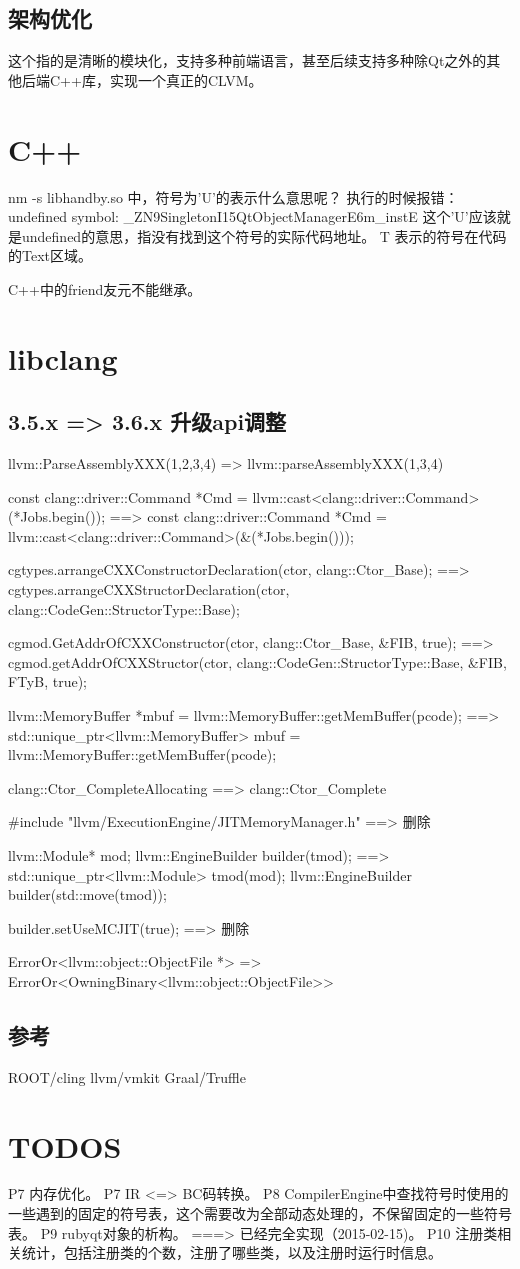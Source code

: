 \section{架构优化}
这个指的是清晰的模块化，支持多种前端语言，甚至后续支持多种除Qt之外的其他后端C++库，实现一个真正的CLVM。


\chapter{C++}
nm -s libhandby.so 中，符号为'U'的表示什么意思呢？
执行的时候报错：undefined symbol: \_ZN9SingletonI15QtObjectManagerE6m\_instE
这个'U'应该就是undefined的意思，指没有找到这个符号的实际代码地址。
T 表示的符号在代码的Text区域。

C++中的friend友元不能继承。

\chapter{libclang}
\section{3.5.x => 3.6.x 升级api调整}
llvm::ParseAssemblyXXX(1,2,3,4) => llvm::parseAssemblyXXX(1,3,4)

const clang::driver::Command *Cmd = llvm::cast<clang::driver::Command>(*Jobs.begin());
==> const clang::driver::Command *Cmd = llvm::cast<clang::driver::Command>(&(*Jobs.begin()));

cgtypes.arrangeCXXConstructorDeclaration(ctor, clang::Ctor\_Base);
==>  cgtypes.arrangeCXXStructorDeclaration(ctor, clang::CodeGen::StructorType::Base);

cgmod.GetAddrOfCXXConstructor(ctor, clang::Ctor\_Base, &FIB, true);
==>  cgmod.getAddrOfCXXStructor(ctor, clang::CodeGen::StructorType::Base, &FIB, FTyB, true);

llvm::MemoryBuffer *mbuf = llvm::MemoryBuffer::getMemBuffer(pcode);
==>  std::unique\_ptr<llvm::MemoryBuffer> mbuf = llvm::MemoryBuffer::getMemBuffer(pcode);

clang::Ctor\_CompleteAllocating ==> clang::Ctor\_Complete

#include "llvm/ExecutionEngine/JITMemoryManager.h"
==> 删除

llvm::Module* mod;
llvm::EngineBuilder builder(tmod);
==> 
std::unique\_ptr<llvm::Module> tmod(mod);
llvm::EngineBuilder builder(std::move(tmod));

builder.setUseMCJIT(true); ==> 删除

ErrorOr<llvm::object::ObjectFile *> => ErrorOr<OwningBinary<llvm::object::ObjectFile>>

\section{参考}
ROOT/cling
llvm/vmkit
Graal/Truffle

\chapter{TODOS}
P7  内存优化。
P7  IR <=> BC码转换。
P8  CompilerEngine中查找符号时使用的一些遇到的固定的符号表，这个需要改为全部动态处理的，不保留固定的一些符号表。
P9  rubyqt对象的析构。 ===> 已经完全实现（2015-02-15)。
P10 注册类相关统计，包括注册类的个数，注册了哪些类，以及注册时运行时信息。

